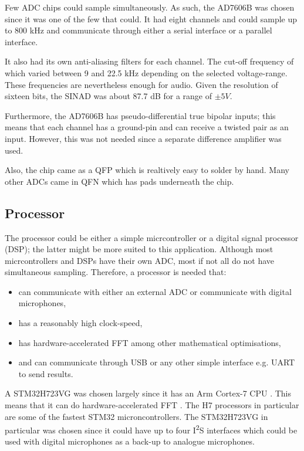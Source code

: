 \documentclass[notitlepage]{report}
\begin{document}
Few ADC chips could sample simultaneously. As such, the AD7606B was chosen since it was one of the few that could. It had eight channels and could sample up to 800 \si{kHz} and communicate through either a serial interface or a parallel interface. 

It also had its own anti-aliasing filters for each channel. The cut-off frequency of which varied between 9 and 22.5 \si{kHz} depending on the selected voltage-range. These frequencies are nevertheless enough for audio. Given the resolution of sixteen bits, the SINAD was about 87.7 \si{dB} for a range of $\pm5\si{V}$.

Furthermore, the AD7606B has pseudo-differential true bipolar inputs; this means that each channel has a ground-pin and can receive a twisted pair as an input. However, this was not needed since a separate difference amplifier was used.

Also, the chip came as a QFP which is realtively easy to solder by hand. Many other ADCs came in QFN which has pads underneath the chip.

\subsection{Processor}

The processor could be either a simple micrcontroller or a digital signal processor (DSP); the latter might be more suited to this application. Although most micrcontrollers and DSPs have their own ADC, most if not all do not have simultaneous sampling. Therefore, a processor is needed that:
\begin{itemize}
	\item can communicate with either an external ADC or communicate with digital microphones,
	\item has a reasonably high clock-speed,
	\item has hardware-accelerated FFT among other mathematical optimisations,
	\item and can communicate through USB or any other simple interface e.g. UART to send results.
\end{itemize}

A STM32H723VG was chosen largely since it has an Arm Cortex-7 CPU \cite{noauthor_arm_2021}. This means that it can do hardware-accelerated FFT \cite{noauthor_digital_2018}. The H7 processors in particular are some of the fastest STM32 microncontrollers. The STM32H723VG in particular was chosen since it could have up to four I\textsuperscript{2}S interfaces which could be used with digital microphones as a back-up to analogue microphones.
\end{document}
